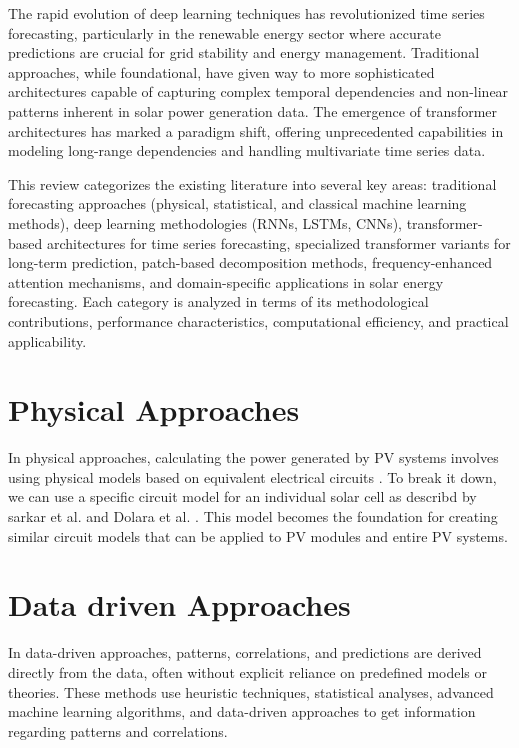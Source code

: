 \documentclass[12pt]{uomthesis}
\begin{document}
The rapid evolution of deep learning techniques has revolutionized time series forecasting, particularly in the renewable energy sector where accurate predictions are crucial for grid stability and energy management. Traditional approaches, while foundational, have given way to more sophisticated architectures capable of capturing complex temporal dependencies and non-linear patterns inherent in solar power generation data. The emergence of transformer architectures has marked a paradigm shift, offering unprecedented capabilities in modeling long-range dependencies and handling multivariate time series data.

This review categorizes the existing literature into several key areas: traditional forecasting approaches (physical, statistical, and classical machine learning methods), deep learning methodologies (RNNs, LSTMs, CNNs), transformer-based architectures for time series forecasting, specialized transformer variants for long-term prediction, patch-based decomposition methods, frequency-enhanced attention mechanisms, and domain-specific applications in solar energy forecasting. Each category is analyzed in terms of its methodological contributions, performance characteristics, computational efficiency, and practical applicability. 


\section{Physical Approaches}
In physical approaches, calculating the power generated by PV systems involves using physical models based on equivalent electrical circuits \cite{tian2012cell}. To break it down, we can use a specific circuit model for an individual solar cell as describd by sarkar et al. \cite{sarkar2016effect} and Dolara et al. \cite{dolara2015comparison}. This model becomes the foundation for creating similar circuit models that can be applied to PV modules and entire PV systems.

\section{Data driven Approaches}
\label{Sec:Intro:Render}
In data-driven approaches, patterns, correlations, and predictions are derived directly from the data, often without explicit reliance on predefined models or theories. These methods use heuristic techniques, statistical analyses, advanced machine learning algorithms, and data-driven approaches \cite{ij2018statistics} to get information regarding patterns and correlations.
\end{document}
